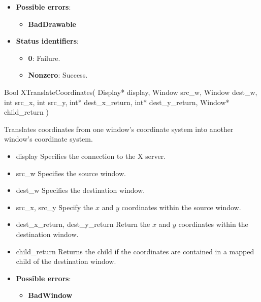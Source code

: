 \documentclass{report}
\begin{document}
\begin{itemize}
            \begin{itemize}
                \item \textbf{Possible errors}:
                    \begin{itemize}
                        \item \textbf{BadDrawable}
                    \end{itemize}
                \item \textbf{Status identifiers}:
                    \begin{itemize}
                        \item \textbf{0}: Failure.
                        \item \textbf{Nonzero}: Success.
                    \end{itemize}
            \end{itemize}

            \begin{cppcode}
                Bool XTranslateCoordinates(
                    Display* display,
                    Window src_w, Window dest_w,
                    int src_x, int src_y,
                    int* dest_x_return, int* dest_y_return,
                    Window* child_return
            )
            \end{cppcode}
            \bigbreak \noindent
            Translates coordinates from one window’s coordinate system into another window’s coordinate system.

            \begin{itemize}
                \item display Specifies the connection to the X server.
                \item src\_w Specifies the source window.
                \item dest\_w Specifies the destination window.
                \item src\_x, src\_y Specify the $x$ and $y$ coordinates within the source window.
                \item dest\_x\_return, dest\_y\_return Return the $x$ and $y$ coordinates within the destination window.
                \item child\_return Returns the child if the coordinates are contained in a mapped child of the destination window.
            \end{itemize}

            \begin{itemize}
                \item \textbf{Possible errors}:
                    \begin{itemize}
                        \item \textbf{BadWindow}
                    \end{itemize}
            \end{itemize}


\end{itemize}
\end{document}
